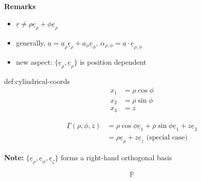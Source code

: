 \documentclass{article}
\begin{document}
\textbf{Remarks}

\begin{itemize}
    \item $\underline{r} \ne \rho \underline{e}_{\rho} + \phi\underline{e}_{\rho}$
    \item generally, $\underline{a} = \underline{a}_{\rho}\underline{\epsilon}_{\rho} + a_{\phi}\underline{e}_{\phi},\, \alpha_{\rho, \phi} = \underline{a} \cdot \underline{e}_{\rho, \phi}$
    \item new aspect: $\{ \underline{e}_{\rho}, \underline{e}_{\rho}\}$ is position dependent
\end{itemize}


\begin{dfn}{def:cylindrical-coords}{}
    \begin{align*}
        x_{1} &= \rho\cos\phi\\
        x_{2} &= \rho\sin\phi\\
        x_{3} &= z
    \end{align*}

    \begin{align*}
        \underline{\Gamma}(\rho,\phi,z) &= \rho\cos\phi \underline{e}_{1} + \rho\sin\phi\underline{e}_{1} + z\underline{e}_{3}\\
                                        &= \rho\underline{e}_{\rho} + z\underline{e}_{z} \text{ (special case)}
    \end{align*}

    \textbf{Note:} $\{\underline{e}_{\rho}, \underline{e}_{\phi}, \underline{e}_{\zeta}\}$ forms a right-hand orthogonal basis
\end{dfn}

\[\mathbb{P}\]
\end{document}
